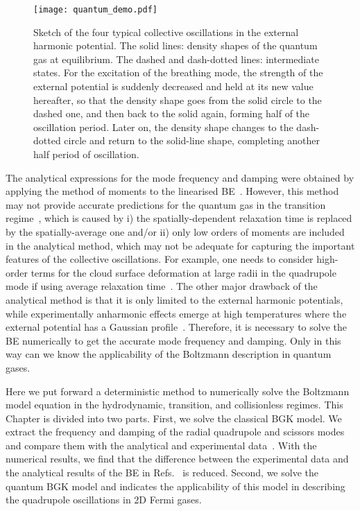 \begin{figure}[t]
\center
\texttt{[image: quantum\_demo.pdf]}
\caption[Sketch of the four typical collective oscillations in the external harmonic potential.]{Sketch of the four typical collective oscillations in the external harmonic potential. The solid lines: density shapes of the quantum gas at equilibrium. The dashed and dash-dotted lines: intermediate states. For the excitation of the breathing mode, the strength of the external potential is suddenly decreased and held at its new value hereafter, so that the density shape goes from the solid circle to the dashed one, and then back to the solid again, forming half of the oscillation period. Later on, the density shape changes to the dash-dotted circle and return to the solid-line shape, completing another half period of oscillation.  }
\label{quan_demo}
\end{figure}


The analytical expressions for the mode frequency and damping were obtained by applying the method of moments to the linearised BE~\cite{AlKhawaja2000,Guery-Odelin1999,Massignan2005,Bruun2007,Riedl2008}. However, this method may not provide accurate predictions for the quantum gas in the transition regime~\cite{Riedl2008,Lepers2010}, which is caused by i) the spatially-dependent relaxation time is replaced by the spatially-average one and/or ii) only low orders of moments are included in the analytical method, which may not be adequate for capturing the important features of the collective oscillations. For example, one needs to consider high-order terms for the cloud surface deformation at large radii in the quadrupole mode if using average relaxation time~\cite{Lepers2010}. The other major drawback of the analytical method is that it is only limited to the external harmonic potentials, while experimentally anharmonic effects emerge at high temperatures where the external potential has a Gaussian profile~\cite{Riedl2008,Wright2007}. Therefore, it is necessary to solve the BE numerically to get the accurate mode frequency and damping. Only in this way can we know the applicability of the Boltzmann description in quantum gases. 


Here we put forward a deterministic method to numerically solve the Boltzmann model equation in the hydrodynamic, transition, and collisionless regimes. This Chapter is divided into two parts. First, we solve the classical BGK model. We extract the frequency and damping of the radial quadrupole and scissors modes and compare them with the analytical and experimental data~\cite{Wright2007,AlKhawaja2000, Riedl2008,Bruun2007}. With the numerical results, we find that the difference between the experimental data and the analytical results of the BE in Refs.~\cite{Wright2007, Riedl2008} is reduced. Second, we solve the quantum BGK model and indicates the applicability of this model in describing the quadrupole oscillations in 2D Fermi gases.


